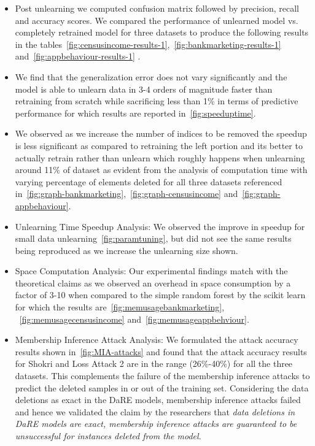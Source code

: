 \documentclass[11pt,letterpaper]{article}
\begin{document}
\begin{itemize}
    \item Post unlearning we computed confusion matrix followed by precision, recall and accuracy scores. We compared the performance of unlearned model vs. completely retrained model for three datasets to produce the following results in the tables~\ref{fig:censusincome-results-1},~\ref{fig:bankmarketing-results-1} and~\ref{fig:appbehaviour-results-1} .
    \item We find that the generalization error does not vary significantly and the model is able to unlearn data in 3-4 orders of magnitude faster than retraining from scratch while sacrificing less than 1\% in terms of predictive performance for which results are reported in~\ref{fig:speeduptime}.
    \item We observed as we increase the number of indices to be removed the speedup is less significant as compared to retraining the left portion and its better to actually retrain rather than unlearn which roughly happens when unlearning around 11$\%$ of dataset as evident from the analysis of computation time with varying percentage of elements deleted for all three datasets referenced in~\ref{fig:graph-bankmarketing},~\ref{fig:graph-censusincome} and~\ref{fig:graph-appbehaviour}.
    \item Unlearning Time Speedup Analysis: We observed the improve in speedup for small data unlearning~\ref{fig:paramtuning}, but did not see the same results being reproduced as we increase the unlearning size shown.
    \item Space Computation Analysis: Our experimental findings match with the theoretical claims as we observed an overhead in space consumption by a factor of 3-10 when compared to the simple random forest by the scikit learn for which the results are~\ref{fig:memusagebankmarketing}, ~\ref{fig:memusagecensusincome} and~\ref{fig:memusageappbehviour}. 
    \item Membership Inference Attack Analysis: We formulated the attack accuracy results shown in~\ref{fig:MIA-attacks} and found that the attack accuracy results for Shokri and Loss Attack 2 are in the range (26\%-40\%) for all the three datasets. This complements the failure of the membership inference attacks to predict the deleted samples in or out of the training set. Considering the data deletions as exact in the DaRE models, membership inference attacks failed and hence we validated the claim by the researchers that \textit{data deletions in DaRE models are exact, membership inference attacks are guaranteed to be unsuccessful for instances deleted from the model}.
    
\end{itemize}    
\end{document}
